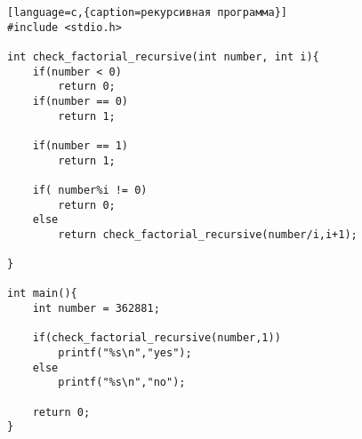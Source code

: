 \documentclass[a4paper,12pt]{article}
\begin{document}
\begin{lstlisting}[language=c,{caption=рекурсивная программа}]
#include <stdio.h>

int check_factorial_recursive(int number, int i){
	if(number < 0) 
		return 0;	
	if(number == 0)
		return 1;

	if(number == 1)
		return 1;
	
	if( number%i != 0)
		return 0;
	else		
		return check_factorial_recursive(number/i,i+1);
	
}

int main(){
	int number = 362881;

	if(check_factorial_recursive(number,1))
		printf("%s\n","yes");
	else
		printf("%s\n","no");

	return 0;
}
\end{lstlisting}
\end{document}
